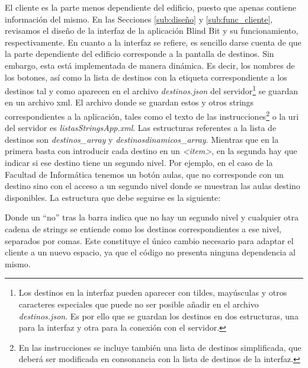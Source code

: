 El cliente es la parte menos dependiente del edificio, puesto que apenas contiene información del mismo. En las Secciones \ref{sub:diseño} y \ref{sub:func_cliente}, revisamos el diseño de la interfaz de la aplicación Blind Bit y su funcionamiento, respectivamente. En cuanto a la interfaz se refiere, es sencillo darse cuenta de que la parte dependiente del edificio corresponde a la pantalla de destinos. Sin embargo, esta está implementada de manera dinámica. Es decir, los nombres de los botones, así como la lista de destinos con la etiqueta correspondiente a los destinos tal y como aparecen en el archivo \textit{destinos.json} del servidor\footnote{Los destinos en la interfaz pueden aparecer con tildes, mayúsculas y otros caracteres especiales que puede no ser posible añadir en el archivo \textit{destinos.json}. Es por ello que se guardan los destinos en dos estructuras, una para la interfaz y otra para la conexión con el servidor.} se guardan en un archivo xml. El archivo donde se guardan estos y otros strings correspondientes a la aplicación, tales como el texto de las instrucciones\footnote{En las instrucciones se incluye también una lista de destinos simplificada, que deberá ser modificada en consonancia con la lista de destinos de la interfaz.} o la uri del servidor es \textit{listasStringsApp.xml}. Las estructuras referentes a la lista de destinos son \textit{destinos\_array} y \textit{destinosdinamicos\_array}. Mientras que en la primera basta con introducir cada destino en un \textit{<item>}, en la segunda hay que indicar si ese destino tiene un segundo nivel. Por ejemplo, en el caso de la Facultad de Informática tenemos un botón aulas, que no corresponde con un destino sino con el acceso a un segundo nivel donde se muestran las aulas destino disponibles. La estructura que debe seguirse es la siguiente: 

 



Donde un ``no'' tras la barra indica que no hay un segundo nivel y cualquier otra cadena de strings se entiende como los destinos correspondientes a ese nivel, separados por comas. Este constituye el único cambio necesario para adaptar el cliente a un nuevo espacio, ya que el código no presenta ninguna dependencia al mismo.



